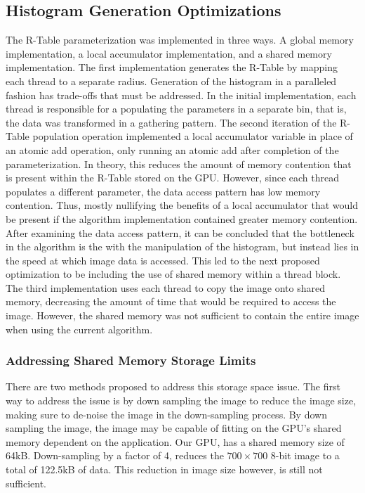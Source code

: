 \documentclass[conference]{IEEEtran}
\begin{document}
\subsection*{Histogram Generation Optimizations}
The R-Table parameterization was implemented in three ways. A global memory implementation, a local accumulator implementation, and a shared memory implementation.
The first implementation generates the R-Table by mapping each thread to a separate radius.
Generation of the histogram in a paralleled fashion has trade-offs that must be addressed. 
In the initial implementation, each thread is responsible for a populating the parameters in a separate bin, that is, the data was transformed in a gathering pattern. 
The second iteration of the R-Table population operation implemented a local accumulator variable in place of an atomic add operation, only running an atomic add after completion of the parameterization.
In theory, this reduces the amount of memory contention that is present within the R-Table stored on the GPU\@.
However, since each thread populates a different parameter, the data access pattern has low memory contention.
Thus, mostly nullifying the benefits of a local accumulator that would be present if the algorithm implementation contained greater memory contention.
After examining the data access pattern, it can be concluded that the bottleneck in the algorithm is the with the manipulation of the histogram, but instead lies in the speed at which image data is accessed.
This led to the next proposed optimization to be including the use of shared memory within a thread block.
The third implementation uses each thread to copy the image onto shared memory, decreasing the amount of time that would be required to access the image.
However, the shared memory was not sufficient to contain the entire image when using the current algorithm.

\subsubsection*{Addressing Shared Memory Storage Limits}
There are two methods proposed to address this storage space issue. 
The first way to address the issue is by down sampling the image to reduce the image size, making sure to de-noise the image in the down-sampling process. 
By down sampling the image, the image may be capable of fitting on the GPU's shared memory dependent on the application.
Our GPU, has a shared memory size of 64kB.
Down-sampling by a factor of 4, reduces the $700 \times 700$ 8-bit image to a total of 122.5kB of data. 
This reduction in image size however, is still not sufficient. 
\end{document}
